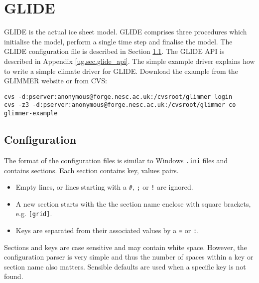 \section{GLIDE}
GLIDE is the actual ice sheet model. GLIDE comprises three procedures which initialise the model, perform a single time step and finalise the model. The GLIDE configuration file is described in Section \ref{ug.sec.config}. The GLIDE API is described in Appendix \ref{ug.sec.glide_api}. The simple example driver explains how to write a simple climate driver for GLIDE. Download the example from the GLIMMER website or from CVS:
\begin{verbatim}
cvs -d:pserver:anonymous@forge.nesc.ac.uk:/cvsroot/glimmer login
cvs -z3 -d:pserver:anonymous@forge.nesc.ac.uk:/cvsroot/glimmer co glimmer-example
\end{verbatim}

\subsection{Configuration}\label{ug.sec.config}
The format of the configuration files is similar to Windows \texttt{.ini} files and contains sections. Each section contains key, values pairs.
\begin{itemize}
\item Empty lines, or lines starting with a \texttt{\#}, \texttt{;} or \texttt{!} are ignored.
\item A new section starts with the the section name enclose with square brackets, e.g. \texttt{[grid]}.
\item Keys are separated from their associated values by a \texttt{=} or \texttt{:}.
\end{itemize}
Sections and keys are case sensitive and may contain white space. However, the configuration parser is very simple and thus the number of spaces within a key or section name also matters. Sensible defaults are used when a specific key is not found.


